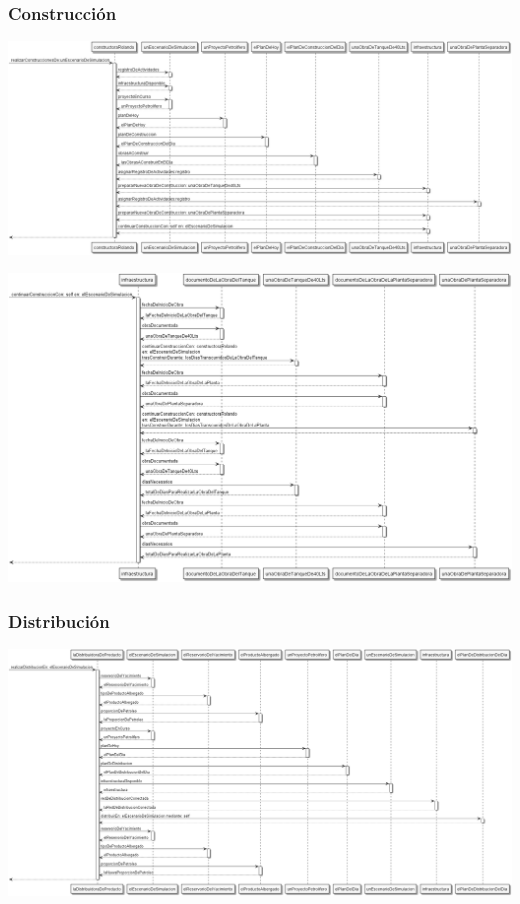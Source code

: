 \documentclass[10pt,a3paper, ,landscape]{article}
\begin{document}
\pagebreak

\subsubsection{Construcción}
\centerline{\includegraphics[scale=0.4]{images/secuenciaConstruir.png}}
\vspace{1cm}
\centerline{\includegraphics[scale=0.4]{images/secuenciaConstruirInfraestructura.png}}

\subsubsection{Distribución}

\centerline{\includegraphics[scale=0.65]{images/secuenciaDistribucion.png}}
\end{document}
